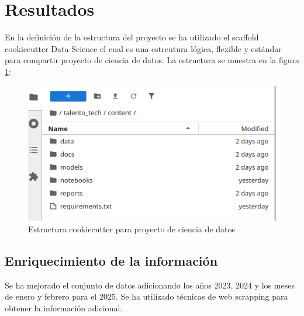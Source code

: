 \documentclass{article}
\begin{document}
\section{Resultados}

En la definici\'on de la estructura del proyecto se ha utilizado el scaffold cookiecutter Data Science el cual es una estrcutura l\'ogica, flexible y est\'andar para compartir proyecto de ciencia de datos. La estructura se muestra en la figura \ref{fig:cookiecutter}:

\begin{figure}
	\centering
	\includegraphics[width=0.7\linewidth]{cookiecutter}
	\caption[Estructura cookiecutter]{Estructura cookiecutter para proyecto de ciencia de datos}
	\label{fig:cookiecutter}
\end{figure}


\subsection{Enriquecimiento de la informaci\'on}

Se ha mejorado el conjunto de datos adicionando los a\~nos 2023, 2024 y los meses de enero y febrero para el 2025. Se ha utilizado t\'ecnicas de web scrapping para obtener la informaci\'on adicional.
\end{document}
